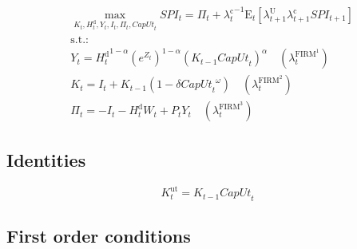\begin{align}
&\max_{K_{t}, H^{\mathrm{d}}_{t}, Y_{t}, I_{t}, \Pi_{t}, {C\!a\!p\!U\!t}_{t}
} {S\!P\!I}_{t} = \Pi_{t} + {\lambda^{\mathrm{c}}_{t}}^{-1} {\mathrm{E}_{t}\left[{\lambda^{\mathrm{U}}_{t+1}} {\lambda^{\mathrm{c}}_{t+1}} {{S\!P\!I}_{t+1}}\right]}\\
&\mathrm{s.t.:}\nonumber\\
& Y_{t} = {{H^{\mathrm{d}}_{t}}^{1 - \alpha}} {\left(e^{Z_{t}}\right)^{1 - \alpha}} {\left({K_{t-1}} {{C\!a\!p\!U\!t}_{t}}\right)^{\alpha}} \quad \left(\lambda^{\mathrm{FIRM}^{\mathrm{1}}}_{t}\right)\\
& K_{t} = I_{t} + {K_{t-1}} \left(1 - {\delta} {{{C\!a\!p\!U\!t}_{t}}^{\omega}}\right) \quad \left(\lambda^{\mathrm{FIRM}^{\mathrm{2}}}_{t}\right)\\
& \Pi_{t} = -I_{t} - {H^{\mathrm{d}}_{t}} {W_{t}} + {P_{t}} {Y_{t}} \quad \left(\lambda^{\mathrm{FIRM}^{\mathrm{3}}}_{t}\right)
\end{align}


\subsection{Identities}

\begin{equation}
K^{\mathrm{ut}}_{t} = {K_{t-1}} {{C\!a\!p\!U\!t}_{t}}
\end{equation}


\subsection{First order conditions}

